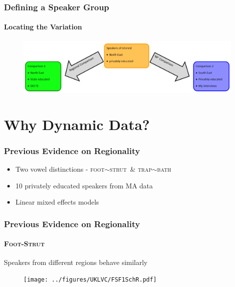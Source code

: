 \documentclass[
xcolor=table,
PHONON=true]
{beamer}
\newcommand{\scs}{\textsc}
\newcommand{\FS}{\scs{foot}$\sim$\scs{strut}~}
\newcommand{\TB}{\scs{trap}$\sim$\scs{bath}~}
\begin{document}
	\begin{frame}
		\frametitle{Defining a Speaker Group}
		\framesubtitle{Locating the Variation}
		\begin{figure}
			\centering
			\includegraphics[scale=0.53]{../img/ComparisonMethodology-horiz.png}
		\end{figure}
	\end{frame}

\section{Why Dynamic Data?}

		\begin{frame}
		\frametitle{Previous Evidence on Regionality}
		\begin{itemize}
			\item Two vowel distinctions - \FS \& \TB
			\item 10 privately educated speakers from MA data
			\item Linear mixed effects models \citep{lme4}
		\end{itemize}
	\end{frame}
	
	\begin{frame}
		\frametitle{Previous Evidence on Regionality}
			\framesubtitle{\scs{Foot-Strut}}
			\pause
			Speakers from different regions behave similarly
			\begin{figure}
				\centering
				\texttt{[image: ../figures/UKLVC/FSF1SchR.pdf]}
			\end{figure}
	\end{frame}
	
\end{document}
